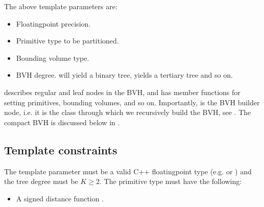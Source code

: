 \documentclass[letterpaper,10pt,english]{sphinxmanual}
\begin{document}
\sphinxAtStartPar
The above template parameters are:
\begin{itemize}
\item {} 
\sphinxAtStartPar
{} Floating\sphinxhyphen{}point precision.

\item {} 
\sphinxAtStartPar
{} Primitive type to be partitioned.

\item {} 
\sphinxAtStartPar
{} Bounding volume type.

\item {} 
\sphinxAtStartPar
{} BVH degree.  will yield a binary tree,  yields a tertiary tree and so on.

\end{itemize}

\sphinxAtStartPar
{} describes regular and leaf nodes in the BVH, and has member functions for setting primitives, bounding volumes, and so on.
Importantly,  is the BVH builder node, i.e. it is the class through which we recursively build the BVH, see {\hyperref[\detokenize{ImplemBVH:chap-bvhconstruction}]{}}.
The compact BVH is discussed below in {\hyperref[\detokenize{ImplemBVH:chap-linearbvh}]{}}.


\subsection{Template constraints}
\label{\detokenize{ImplemBVH:template-constraints}}
\sphinxAtStartPar
The template parameter  must be a valid C++ floating\sphinxhyphen{}point type (e.g.  or ) and the tree degree must be \(K \geq 2\).
The primitive type  must have the following:
\begin{itemize}
\item {} 
\sphinxAtStartPar
A signed distance function .

\end{itemize}
\end{document}
